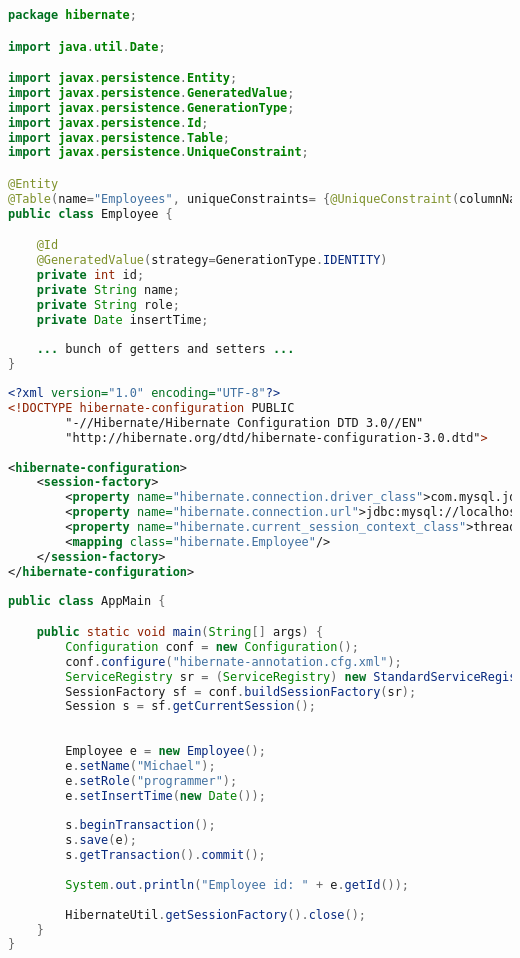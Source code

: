 \begin{lstlisting}[language=java]
package hibernate;

import java.util.Date;

import javax.persistence.Entity;
import javax.persistence.GeneratedValue;
import javax.persistence.GenerationType;
import javax.persistence.Id;
import javax.persistence.Table;
import javax.persistence.UniqueConstraint;

@Entity
@Table(name="Employees", uniqueConstraints= {@UniqueConstraint(columnNames = { "id" })})
public class Employee {

	@Id
	@GeneratedValue(strategy=GenerationType.IDENTITY)
	private int id;
	private String name;
	private String role;
	private Date insertTime;
	
	... bunch of getters and setters ...
}
\end{lstlisting}


\begin{lstlisting}[language=xml, name=hibernate-annotation.cfg.xml]
<?xml version="1.0" encoding="UTF-8"?>
<!DOCTYPE hibernate-configuration PUBLIC
		"-//Hibernate/Hibernate Configuration DTD 3.0//EN"
		"http://hibernate.org/dtd/hibernate-configuration-3.0.dtd">
		
<hibernate-configuration>
	<session-factory>
		<property name="hibernate.connection.driver_class">com.mysql.jdbc.Driver</property>
		<property name="hibernate.connection.url">jdbc:mysql://localhost/testdb</property>
		<property name="hibernate.current_session_context_class">thread</property>
		<mapping class="hibernate.Employee"/>
	</session-factory>
</hibernate-configuration>
\end{lstlisting}

\begin{lstlisting}[language=java]
public class AppMain {

	public static void main(String[] args) {
		Configuration conf = new Configuration();
		conf.configure("hibernate-annotation.cfg.xml");
		ServiceRegistry sr = (ServiceRegistry) new StandardServiceRegistryBuilder().applySettings(conf.getProperties()).build();
		SessionFactory sf = conf.buildSessionFactory(sr);
		Session s = sf.getCurrentSession();
		
		
		Employee e = new Employee();
		e.setName("Michael");
		e.setRole("programmer");
		e.setInsertTime(new Date());
		
		s.beginTransaction();
		s.save(e);
		s.getTransaction().commit();
		
		System.out.println("Employee id: " + e.getId());
		
		HibernateUtil.getSessionFactory().close();
	}
}
\end{lstlisting}


